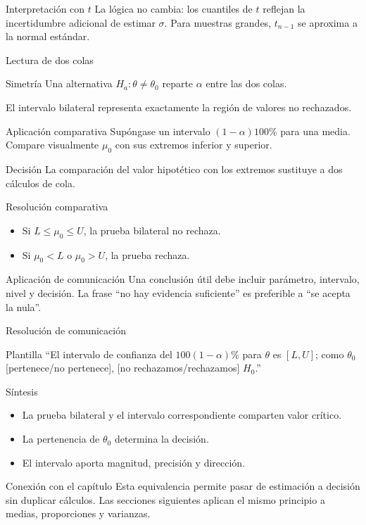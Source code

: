 \documentclass[10pt,aspectratio=169]{beamer}
\begin{document}
\begin{frame}{Interpretación con $t$}\small
La lógica no cambia: los cuantiles de $t$ reflejan la incertidumbre adicional de estimar $\sigma$. Para muestras grandes, $t_{n-1}$ se aproxima a la normal estándar.
\end{frame}
\begin{frame}{Lectura de dos colas}\small
\begin{block}{Simetría} Una alternativa $H_a:\theta\neq\theta_0$ reparte $\alpha$ entre las dos colas.\end{block}
El intervalo bilateral representa exactamente la región de valores no rechazados.
\end{frame}
\begin{frame}{Aplicación comparativa}\small
Supóngase un intervalo $(1-\alpha)100\%$ para una media. Compare visualmente $\mu_0$ con sus extremos inferior y superior.
\begin{block}{Decisión} La comparación del valor hipotético con los extremos sustituye a dos cálculos de cola.\end{block}
\end{frame}
\begin{frame}{Resolución comparativa}\small
\begin{itemize}\item Si $L\leq\mu_0\leq U$, la prueba bilateral no rechaza.\item Si $\mu_0<L$ o $\mu_0>U$, la prueba rechaza.\end{itemize}
\end{frame}
\begin{frame}{Aplicación de comunicación}\small
Una conclusión útil debe incluir parámetro, intervalo, nivel y decisión. La frase ``no hay evidencia suficiente'' es preferible a ``se acepta la nula''.
\end{frame}
\begin{frame}{Resolución de comunicación}\small
\begin{block}{Plantilla} ``El intervalo de confianza del $100(1-\alpha)\%$ para $\theta$ es $[L,U]$; como $\theta_0$ [pertenece/no pertenece], [no rechazamos/rechazamos] $H_0$.''\end{block}
\end{frame}
\begin{frame}{Síntesis}\small
\begin{itemize}\item La prueba bilateral y el intervalo correspondiente comparten valor crítico.\item La pertenencia de $\theta_0$ determina la decisión.\item El intervalo aporta magnitud, precisión y dirección.\end{itemize}
\end{frame}
\begin{frame}{Conexión con el capítulo}\small
Esta equivalencia permite pasar de estimación a decisión sin duplicar cálculos. Las secciones siguientes aplican el mismo principio a medias, proporciones y varianzas.
\end{frame}
\end{document}
